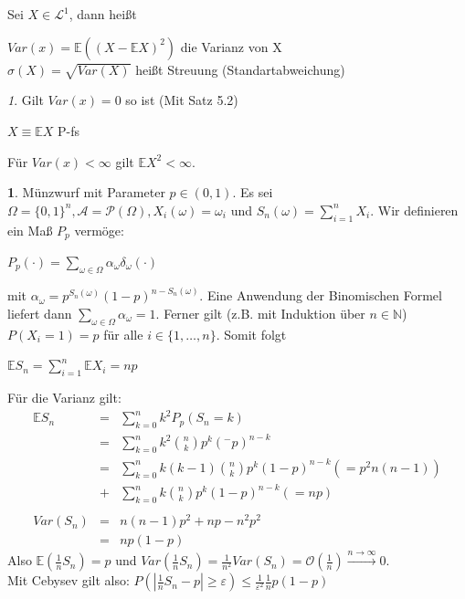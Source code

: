 \documentclass[10pt,a4paper]{report}
\numberwithin{equation}{section}
\numberwithin{figure}{section}
\theoremstyle{plain}
\theoremstyle{definition}
\newtheorem{example}[thm]{\protect\examplename}
\theoremstyle{remark}
\newtheorem{rem}[thm]{\protect\remarkname}
\theoremstyle{plain}
\providecommand{\examplename}{Beispiel}
\providecommand{\remarkname}{Bemerkung}
\newcommand{\1}{ \mathbb{1} } %
\begin{document}
Sei $X \in \mathcal{L}^1$, dann heißt 
\begin{center}
  $Var(x)=\mathbb{E}((X-\mathbb{E}X)^2)$ die Varianz von X\\
  $\sigma(X)=\sqrt{Var(X)}$ heißt Streuung (Standartabweichung)
\end{center} 
\begin{rem}
  Gilt $Var(x)=0$ so ist (Mit Satz 5.2)
  \begin{center}
    $X\equiv \mathbb{E}X$ P-fs
  \end{center}
  Für $Var(x)<\infty$ gilt $\mathbb{E}X^2< \infty$.
\end{rem}
\begin{example}
  Münzwurf mit Parameter $p \in (0,1)$. Es sei $\Omega=\{0,1\}^n,
  \mathcal{A}=\mathcal{P}(\Omega), X_i(\omega)=\omega_i$ und
  $S_n(\omega)=\sum\limits_{i=1}^n X_i$. Wir definieren ein Maß $P_p$
  vermöge:
  \begin{center}
    $P_p(\cdot)=\sum\limits_{\omega \in \Omega}\alpha_\omega
    \delta_\omega(\cdot)$
  \end{center}
  mit $\alpha_\omega=p^{S_n(\omega)}(1-p)^{n-S_n(\omega)}$. 
  Eine Anwendung der Binomischen Formel liefert dann
  $\sum\limits_{\omega \in \Omega}\alpha_\omega=1$. Ferner gilt
  (z.B. mit Induktion über $n \in \mathbb{N}$) $P(X_i=1)=p$ für alle
  $i \in \{1,\dots,n\}$. Somit folgt
  \begin{center}
    $\mathbb{E}S_n=\sum\limits_{i=1}^n\mathbb{E}X_i=np$
  \end{center}
  Für die Varianz gilt:
  \begin{eqnarray*}
    \mathbb{E}S_n&=&\sum\limits_{k=0}^nk^2P_p(S_n=k)\\
    &=& \sum\limits_{k=0}^nk^2\binom{n}{k}p^k(^-p)^{n-k}\\
    &=&\sum\limits_{k=0}^nk(k-1)\binom{n}{k}p^k(1-p)^{n-k} (=p^2n(n-1))\\
    &+& \sum\limits_{k=0}^n k\binom{n}{k}p^k(1-p)^{n-k} (=np)\\\\
    Var(S_n)&=&n(n-1)p^2+np-n^2p^2\\
    &=&np(1-p)
  \end{eqnarray*}
  Also $\mathbb{E}\left(\frac{1}{n}S_n\right)=p$ und $Var\left(\frac{1}{n}S_n\right)=\frac{1}{n^2}Var(S_n)=\mathcal{O}\left(\frac{1}{n}\right) \overset{n \to \infty}{\to} 0$.\\
  Mit Cebysev gilt also: $P\left(\left|\frac{1}{n}S_n-p\right|\geq \varepsilon\right)\leq \frac{1}{\varepsilon^2}\frac{1}{n}p(1-p)$
\end{example}
\end{document}
